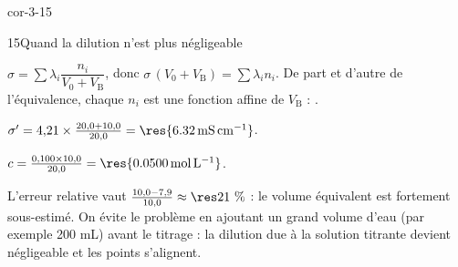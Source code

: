 \begin{blocLivre}{cor-3-15}
\begin{corrige}{15}{Quand la dilution n'est plus négligeable}
\begin{questions}
\item $\sigma=\sum\lambda_i\dfrac{n_i}{V_0+V_\mathrm{B}}$, donc $\sigma\,(V_0+V_\mathrm{B})=\sum\lambda_in_i$. De part et
d'autre de l'équivalence, chaque $n_i$ est une fonction affine de $V_\mathrm{B}$ : .
\item $\sigma'=4{,}21\times\frac{20{,}0+10{,}0}{20{,}0}=\res{\qty{6,32}{mS.cm^{-1}}}$.
\item $c=\frac{0{,}100\times10{,}0}{20{,}0}=\res{\qty{0,0500}{mol.L^{-1}}}$.
\item L'erreur relative vaut $\frac{10{,}0-7{,}9}{10{,}0}\approx\res{21~\%}$ : le volume équivalent est fortement
sous-estimé. On évite le problème en ajoutant un grand volume d'eau (par exemple 200 mL) avant le titrage :
la dilution due à la solution titrante devient négligeable et les points s'alignent.
\end{questions}
\end{corrige}
\end{blocLivre}

